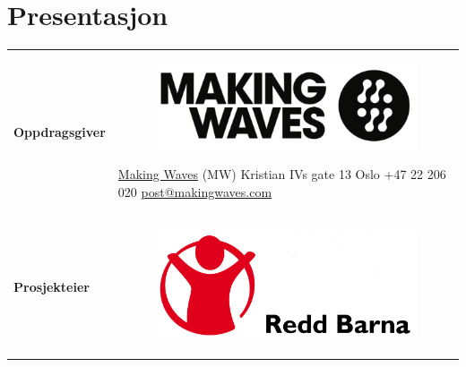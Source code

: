 \chapter{Presentasjon}
\vspace{-1.5cm}
\begin{flushleft}
\renewcommand{\arraystretch}{1.5}
\begin{tabular}[ht]{@{}lp{100mm}@{}}
\textbf{Oppdragsgiver} & 
\begin{figure}
\vspace{-0.75cm}
\hspace{-2.5cm}
\includegraphics[scale=0.15, keepaspectratio]{./img/presentasjon/mw_logo.png}
\end{figure}
\vspace{-0.25cm}
\href{http://www.makingwaves.no/}{Making Waves} (MW) \newline Kristian IVs gate 13 \newline 0164 Oslo \newline +47 22 206 020 \newline \href{mailto:post@makingwaves.com}{post@makingwaves.com} \\
\textbf{Prosjekteier} & 
\begin{figure}
\vspace{-0.75cm}
\hspace{-2.5cm}
\includegraphics[scale=0.075, keepaspectratio]{./img/presentasjon/rb_logo.jpg}
\end{figure}
\vspace{-0.3cm}

\end{tabular}
\end{flushleft}
